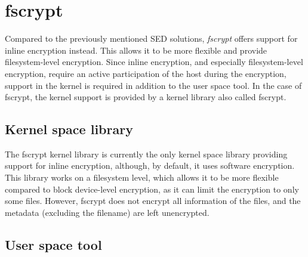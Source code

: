 \section{fscrypt}

Compared to the previously mentioned SED solutions, \emph{fscrypt} offers support for inline encryption instead. This allows it to be more flexible and provide filesystem-level encryption.
Since inline encryption, and especially filesystem-level encryption, require an active participation of the host during the encryption, support in the kernel is required in addition to the user space tool.
In the case of fscrypt, the kernel support is provided by a kernel library also called fscrypt.

\subsection{Kernel space library}

The fscrypt kernel library is currently the only kernel space library providing support for inline encryption, although, by default, it uses software encryption.
This library works on a filesystem level, which allows it to be more flexible compared to block device-level encryption, as it can limit the encryption to only some files. However, fscrypt does not encrypt all information of the files, and the metadata (excluding the filename) are left unencrypted.%



\subsection{User space tool}

